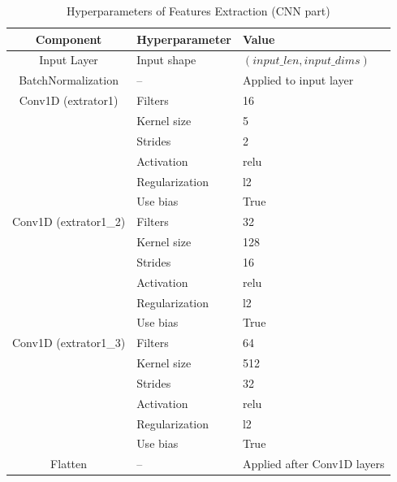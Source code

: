 \documentclass[sigconf,natbib=false]{acmart}
\begin{document}
\begin{table}
  \caption{Hyperparameters of Features Extraction (CNN part)}
  \label{tab:hyperparams_conv}
  \begin{tabular}{cll}
    \toprule
    Component & Hyperparameter & Value \\
    \midrule
    Input Layer & Input shape & $(input\_len, input\_dims)$ \\
    BatchNormalization & -- & Applied to input layer \\
    Conv1D (extrator1) & Filters & 16 \\
                       & Kernel size & 5 \\
                       & Strides & 2 \\
                       & Activation & relu \\
                       & Regularization & l2 \\
                       & Use bias & True \\
    Conv1D (extrator1\_2) & Filters & 32 \\
                          & Kernel size & 128 \\
                          & Strides & 16 \\
                          & Activation & relu \\
                          & Regularization & l2 \\
                          & Use bias & True \\
    Conv1D (extrator1\_3) & Filters & 64 \\
                          & Kernel size & 512 \\
                          & Strides & 32 \\
                          & Activation & relu \\
                          & Regularization & l2 \\
                          & Use bias & True \\
    Flatten & -- & Applied after Conv1D layers \\
    \bottomrule
  \end{tabular}
\end{table}
\end{document}
